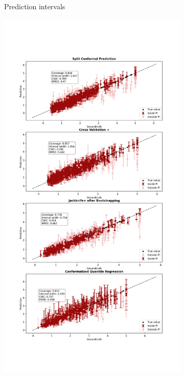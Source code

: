 \begin{figure}[ht]
\begin{subfigure}[b]{0.48\textwidth}
        \caption{Prediction intervals}
        \label{subfig:app-regression-prediction-intervals}
    \end{subfigure}
    \hfill %
    \begin{subfigure}[b]{0.48\textwidth} %
        \centering
        \includegraphics[width=1.2\textwidth, height=3.35\textwidth]{Figures/regression/average-goodness-regression-problem.png} %

\end{subfigure}
\end{figure}
